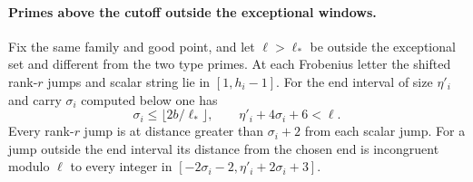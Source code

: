 \paragraph{Primes above the cutoff outside the exceptional windows.}
\label{subsec:outside-windows}
\hypertarget{source-large-prime-length}{}
\begin{established}\label{hyp:offwindow-local}
Fix the same family and good point, and let \(\ell>\ell_*\) be outside
the exceptional set and different from the two type primes.
At each Frobenius letter the shifted rank-\(r\) jumps and scalar string lie in \([1,h_i-1]\). For the end interval of size \(\eta'_i\) and carry \(\sigma_i\) computed below one has
\[
  \sigma_i\le\lfloor 2b/\ell_*\rfloor,\qquad \eta'_i+4\sigma_i+6<\ell .
\]
Every rank-\(r\) jump is at distance greater than \(\sigma_i+2\) from each scalar jump. For a jump outside the end interval its distance from the chosen end is incongruent modulo \(\ell\) to every integer in \([-2\sigma_i-2,\eta'_i+2\sigma_i+3]\).
\end{established}
